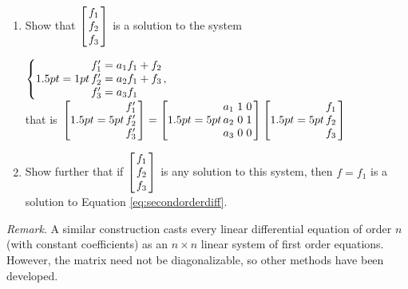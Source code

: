 \begin{multicols}{2}
\begin{ex}
\begin{enumerate}[label={\alph*.}]
\item Show that $\leftB \begin{array}{c}
f_1 \\
f_2 \\
f_3
\end{array}\rightB$
 is a solution to the system

$
\left\lbrace \arraycolsep=1pt
\begin{array}{l}
f_1^{\prime} = a_1f_1 + f_2 \\
f_2^{\prime} = a_2f_1 + f_3 \\
f_3^{\prime} = a_3f_1
\end{array}, \right.$  \\  that is  $ \left. \leftB \arraycolsep=5pt \begin{array}{c}
f_1^{\prime} \\
f_2^{\prime} \\
f_3^{\prime}
\end{array}\rightB = \leftB \arraycolsep=5pt \begin{array}{ccc}
a_1 & 1  & 0 \\
a_2 & 0 & 1 \\
a_3 & 0 & 0
\end{array}\rightB \leftB \arraycolsep=5pt \begin{array}{c}
f_1 \\
f_2 \\
f_3
\end{array}\rightB\right.$

\item Show further that if $\leftB \begin{array}{c}
f_1 \\
f_2 \\
f_3
\end{array}\rightB$
 is any solution to this system, then $f = f_{1}$ is a solution to Equation \ref{eq:secondorderdiff}. 
\end{enumerate}
\textit{Remark}. A similar construction casts every linear differential equation of order $n$ (with constant coefficients) as an $n \times n$ linear system of first order equations. However, the matrix need not be diagonalizable, so other methods have been developed.


\end{ex}

\end{multicols}
